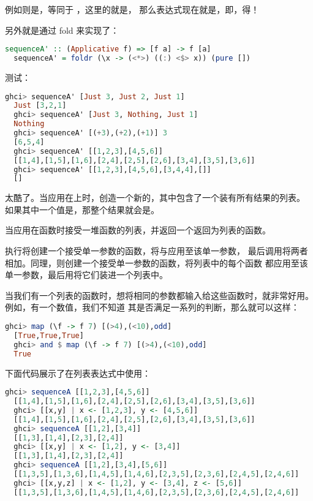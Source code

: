 \documentclass[./main.tex]{subfiles}
\begin{document}
例如则是，等同于
，这里的就是，
那么表达式现在就是，即，得！

另外就是通过 fold 来实现了：

\begin{lstlisting}[language=Haskell]
  sequenceA' :: (Applicative f) => [f a] -> f [a]
  sequenceA' = foldr (\x -> (<*>) ((:) <$> x)) (pure [])
\end{lstlisting}

测试：

\begin{lstlisting}[language=Haskell]
  ghci> sequenceA' [Just 3, Just 2, Just 1]
  Just [3,2,1]
  ghci> sequenceA' [Just 3, Nothing, Just 1]
  Nothing
  ghci> sequenceA' [(+3),(+2),(+1)] 3
  [6,5,4]
  ghci> sequenceA' [[1,2,3],[4,5,6]]
  [[1,4],[1,5],[1,6],[2,4],[2,5],[2,6],[3,4],[3,5],[3,6]]
  ghci> sequenceA' [[1,2,3],[4,5,6],[3,4,4],[]]
  []
\end{lstlisting}

太酷了。当应用在上时，创造一个新的，其中包含了一个装有所有结果的列表。
如果其中一个值是，那整个结果就会是。

当应用在函数时接受一堆函数的列表，并返回一个返回为列表的函数。

执行将创建一个接受单一参数的函数，将与应用至该单一参数，
最后调用\acode{+}将两者相加。同理，则创建一个接受单一参数的函数，将列表中的每个函数
都应用至该单一参数，最后用\acode{:}将它们装进一个列表中。

当我们有一个列表的函数时，想将相同的参数都输入给这些函数时，就非常好用。例如，有一个数值，我们不知道
其是否满足一系列的判断，那么就可以这样：

\begin{lstlisting}[language=Haskell]
  ghci> map (\f -> f 7) [(>4),(<10),odd]
  [True,True,True]
  ghci> and $ map (\f -> f 7) [(>4),(<10),odd]
  True
\end{lstlisting}

下面代码展示了在列表表达式中使用：

\begin{lstlisting}[language=Haskell]
  ghci> sequenceA [[1,2,3],[4,5,6]]
  [[1,4],[1,5],[1,6],[2,4],[2,5],[2,6],[3,4],[3,5],[3,6]]
  ghci> [[x,y] | x <- [1,2,3], y <- [4,5,6]]
  [[1,4],[1,5],[1,6],[2,4],[2,5],[2,6],[3,4],[3,5],[3,6]]
  ghci> sequenceA [[1,2],[3,4]]
  [[1,3],[1,4],[2,3],[2,4]]
  ghci> [[x,y] | x <- [1,2], y <- [3,4]]
  [[1,3],[1,4],[2,3],[2,4]]
  ghci> sequenceA [[1,2],[3,4],[5,6]]
  [[1,3,5],[1,3,6],[1,4,5],[1,4,6],[2,3,5],[2,3,6],[2,4,5],[2,4,6]]
  ghci> [[x,y,z] | x <- [1,2], y <- [3,4], z <- [5,6]]
  [[1,3,5],[1,3,6],[1,4,5],[1,4,6],[2,3,5],[2,3,6],[2,4,5],[2,4,6]]
\end{lstlisting}
\end{document}
